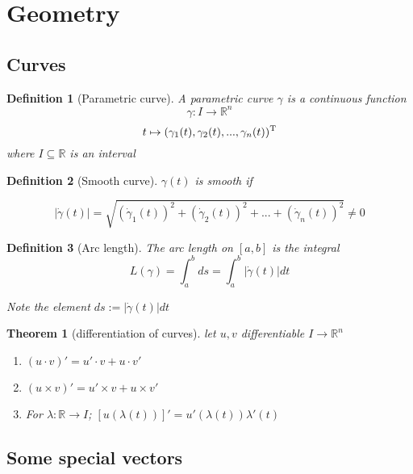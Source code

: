 \documentclass{article}
\theoremstyle{plain}
\newtheorem{theorem}{Theorem}
\newtheorem{definition}{Definition}
\begin{document}
\section{Geometry}

\subsection{Curves}

\begin{definition}[Parametric curve]
    A parametric curve $\gamma$ is a continuous function
    $$\gamma: I \rightarrow \mathbb R^n$$
    $$ t \mapsto (\gamma_1(t), \gamma_2(t), ..., \gamma_n(t))^{\rm T}$$
    where $I \subseteq \mathbb R$ is an interval
    
\end{definition}

\begin{definition}[Smooth curve]
    $\gamma(t)$ is smooth if

    $$|\dot{\gamma}(t)| = \sqrt{(\dot \gamma_1(t))^2 + (\dot \gamma_2(t))^2 + ... + (\dot \gamma_n(t))^2} \neq 0$$
    
\end{definition}

\begin{definition}[Arc length]
    The arc length on $[a, b]$ is the integral
    $$L(\gamma) = \int^{b}_{a} ds = \int^{b}_{a} |\dot{\gamma}(t)| dt $$

    Note the element $ ds :=|\dot{\gamma}(t)| dt$

    
\end{definition}

\begin{theorem}[differentiation of curves]
    let $u, v$ differentiable $I \rightarrow \mathbb R^n$

    \begin{enumerate}
        \item $(u \cdot v)' =  u' \cdot v + u \cdot v'$
        \item $(u \times v)' =  u' \times v + u \times v'$
        
        \item For $\lambda: \mathbb R \rightarrow I$; $[u(\lambda(t))]' = u'(\lambda(t)) \lambda ' (t)$
    \end{enumerate}


\end{theorem}

\subsection{Some special vectors}
\end{document}
